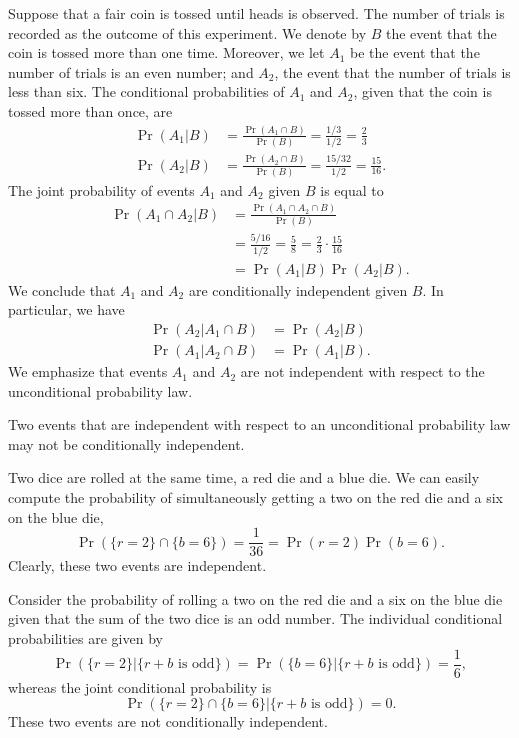 \begin{example}
Suppose that a fair coin is tossed until heads is observed.
The number of trials is recorded as the outcome of this experiment.
We denote by $B$ the event that the coin is tossed more than one time.
Moreover, we let $A_1$ be the event that the number of trials is an even number; and $A_2$, the event that the number of trials is less than six.
The conditional probabilities of $A_1$ and $A_2$, given that the coin is tossed more than once, are
\begin{align*}
\Pr (A_1 | B) &= \frac{ \Pr (A_1 \cap B) }{ \Pr (B) }
= \frac{1/3}{1/2} = \frac{2}{3} \\
\Pr (A_2 | B) &= \frac{ \Pr (A_2 \cap B) }{ \Pr (B) }
= \frac{15/32}{1/2} = \frac{15}{16} .
\end{align*}
The joint probability of events $A_1$ and $A_2$ given $B$ is equal to
\begin{equation*}
\begin{split}
\Pr (A_1 \cap A_2 | B) &= \frac{ \Pr (A_1 \cap A_2 \cap B) }{ \Pr (B) } \\
&= \frac{5/16}{1/2} = \frac{5}{8} = \frac{2}{3} \cdot \frac{15}{16} \\
&= \Pr (A_1 | B) \Pr (A_2 | B) .
\end{split}
\end{equation*}
We conclude that $A_1$ and $A_2$ are conditionally independent given $B$.
In particular, we have
\begin{align*}
\Pr (A_2 | A_1 \cap  B) &= \Pr (A_2 | B) \\
\Pr (A_1 | A_2 \cap  B) &= \Pr (A_1 | B) .
\end{align*}
We emphasize that events $A_1$ and $A_2$ are not independent with respect to the unconditional probability law.
\end{example}

Two events that are independent with respect to an unconditional probability law may not be conditionally independent.

\begin{example}
Two dice are rolled at the same time, a red die and a blue die.
We can easily compute the probability of simultaneously getting a two on the red die and a six on the blue die,
\begin{equation*}
\Pr (\{ r=2 \} \cap \{ b=6 \}) = \frac{1}{36}
= \Pr ( r=2 ) \Pr ( b=6 ) .
\end{equation*}
Clearly, these two events are independent.

Consider the probability of rolling a two on the red die and a six on the blue die given that the sum of the two dice is an odd number.
The individual conditional probabilities are given by
\begin{equation*}
\Pr (\{ r=2 \} | \{ r+b \text{ is odd} \})
= \Pr (\{ b=6 \} | \{ r+b \text{ is odd} \})
= \frac{1}{6},
\end{equation*}
whereas the joint conditional probability is
\begin{equation*}
\Pr (\{ r=2 \} \cap \{ b=6 \} | \{ r+b \text{ is odd} \})
= 0 .
\end{equation*}
These two events are not conditionally independent.
\end{example}

